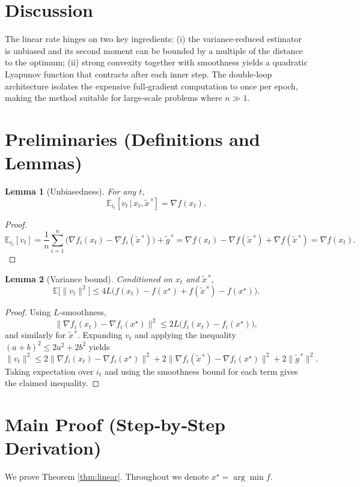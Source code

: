 \documentclass[11pt]{article}
\newtheorem{lemma}{Lemma}
\newcommand{\E}{\mathbb{E}}
\begin{document}
\section*{Discussion}
The linear rate hinges on two key ingredients: (i) the variance‑reduced estimator is unbiased and its second moment can be bounded by a multiple of the distance to the optimum; (ii) strong convexity together with smoothness yields a quadratic Lyapunov function that contracts after each inner step. The double‑loop architecture isolates the expensive full‑gradient computation to once per epoch, making the method suitable for large‑scale problems where $n\gg 1$.

\section*{Preliminaries (Definitions and Lemmas)}
\begin{lemma}[Unbiasedness]\label{lem:unbiased}
For any $t$,
\[
\E_{i_t}[v_t\,|\,x_t,\tilde{x}^{\,s}]=\nabla f(x_t).
\]
\end{lemma}
\begin{proof}
\[
\E_{i_t}[v_t]=\frac{1}{n}\sum_{i=1}^{n}
\big(\nabla f_i(x_t)-\nabla f_i(\tilde{x}^{\,s})\big)+\tilde{g}^{\,s}
=\nabla f(x_t)-\nabla f(\tilde{x}^{\,s})+\nabla f(\tilde{x}^{\,s})=\nabla f(x_t).
\] 
\end{proof}

\begin{lemma}[Variance bound]\label{lem:variance}
Conditioned on $x_t$ and $\tilde{x}^{\,s}$,
\[
\E\big[\|v_t\|^{2}\big]\le 4L\big(f(x_t)-f(x^{\star})+f(\tilde{x}^{\,s})-f(x^{\star})\big).
\]
\end{lemma}
\begin{proof}
Using $L$‑smoothness,
\[
\|\nabla f_i(x_t)-\nabla f_i(x^{\star})\|^{2}\le 2L\big(f_i(x_t)-f_i(x^{\star})\big),
\]
and similarly for $\tilde{x}^{\,s}$. Expanding $v_t$ and applying the inequality $(a+b)^{2}\le 2a^{2}+2b^{2}$ yields
\[
\|v_t\|^{2}\le 2\|\nabla f_i(x_t)-\nabla f_i(x^{\star})\|^{2}
      +2\|\nabla f_i(\tilde{x}^{\,s})-\nabla f_i(x^{\star})\|^{2}
      +2\|\tilde{g}^{\,s}\|^{2}.
\]
Taking expectation over $i_t$ and using the smoothness bound for each term gives the claimed inequality. \qedhere
\]
\end{proof}

\section*{Main Proof (Step‑by‑Step Derivation)}
We prove Theorem \ref{thm:linear}. Throughout we denote $x^{\star}=\arg\min f$.
\end{document}
